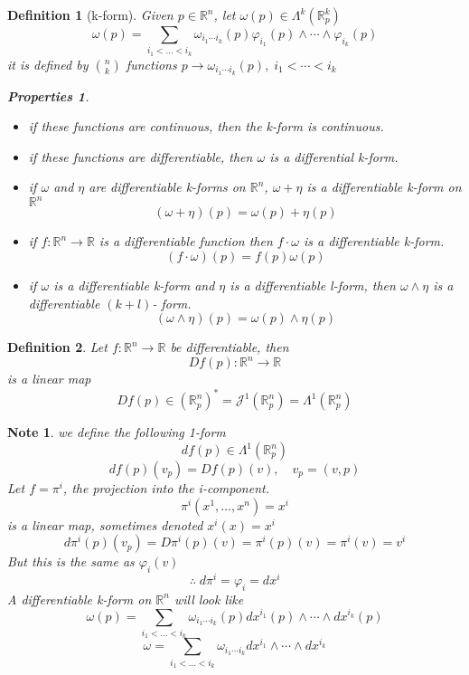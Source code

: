 \documentclass[11pt]{article}
\def\maj{\mathcal{J}}
\def\RR{\mathbb{R}}
\newtheorem{definition}{Definition}[section]
\newtheorem*{note}{Note}
\newtheorem*{properties}{Properties}
\begin{document}
\begin{definition}[k-form]
Given $p \in \RR^n$, let $\omega(p)\in \Lambda^k(\RR_p^k) $
\[\omega(p) = \sum\limits_{i_1<\dots< i_k}\omega_{i_1\cdots i_k}(p)\varphi_{i_1}(p)\wedge\cdots\wedge\varphi_{i_k}(p)\]
it is defined by ${n \choose k}$ functions $p \rightarrow \omega_{i_1\cdots i_k}(p), \; i_1<\cdots <i_k$
\begin{properties}\quad \\
\begin{itemize}
\item if these functions are continuous, then the k-form is continuous. 
\item if these functions are differentiable, then $\omega$ is a differential k-form.
\item if $\omega$ and $\eta$ are differentiable k-forms on $\RR^n$, $\omega + \eta$ is a differentiable k-form on $\RR^n$
\[(\omega + \eta)(p) = \omega(p) + \eta(p)\]
\item if $f:\RR^n \rightarrow \RR$ is a differentiable function then $f\cdot\omega$ is a differentiable k-form.
\[(f\cdot\omega)(p) = f(p)\omega(p)\]
\item if $\omega$ is a differentiable k-form and $\eta$ is a differentiable l-form, then $\omega\wedge\eta$ is a differentiable $(k+l)$- form. 
\[(\omega\wedge\eta)(p) = \omega(p)\wedge\eta(p)\]
\end{itemize}
\end{properties}
\end{definition}

\begin{definition}
Let $f:\RR^n \rightarrow \RR$ be differentiable, then 
\[Df(p):\RR^n \rightarrow \RR\]
is a linear map
\[Df(p) \in (\RR_p^n)^*  = \maj^1(\RR_p^n) = \Lambda^1(\RR_p^n)\]
\end{definition}

\begin{note}
we define the following 1-form
\[df(p) \in \Lambda^1(\RR_p^n)\]
\[df(p)(v_p) = Df(p)(v), \quad v_p= (v,p)\]
Let $f=\pi^i$, the projection into the i-component.
\[\pi^i(x^1, \dots, x^n) = x^i \]
is a linear map, sometimes denoted $x^i(x) = x^i$
\[d\pi^i(p)(v_p) = D\pi^i(p)(v) =\pi^i(p)(v) = \pi^i(v) = v^i\]
But this is the same as $\varphi_i(v)$
\[\therefore \; d\pi^i = \varphi_i = dx^i\]
A differentiable k-form on $\RR^n$ will look like 
\[\omega(p) = \sum\limits_{i_1<\dots< i_k}\omega_{i_1\cdots i_k}(p)dx^{i_1}(p)\wedge\cdots\wedge dx^{i_k}(p)\]
\[\omega = \sum\limits_{i_1<\dots< i_k}\omega_{i_1\cdots i_k}dx^{i_1}\wedge\cdots\wedge dx^{i_k}\]
\end{note}
\end{document}
